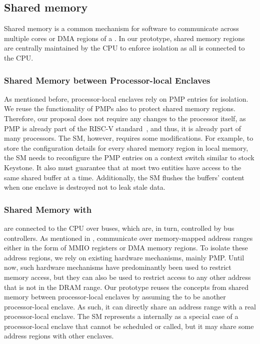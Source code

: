 \subsection{Shared memory}
\label{sec:approach:sharedMemory}
Shared memory is a common mechanism for software to communicate across multiple cores or DMA regions of a \sphw. In our prototype, shared memory regions are centrally maintained by the CPU to enforce isolation as all \sphw is connected to the CPU.



\subsubsection{Shared Memory between Processor-local Enclaves}
As mentioned before, processor-local enclaves rely on PMP entries for isolation. We reuse the functionality of PMPs also to protect shared memory regions. Therefore, our proposal does not require any changes to the processor itself, as PMP is already part of the RISC-V standard~\cite{riscv2019privspec}, and thus, it is already part of many processors. The SM, however, requires some modifications. For example, to store the configuration details for every shared memory region in local memory, the SM needs to reconfigure the PMP entries on a context switch similar to stock Keystone. It also must guarantee that at most two entities have access to the same shared buffer at a time. Additionally, the SM flushes the buffers' content when one enclave is destroyed not to leak stale data. 


\subsubsection{Shared Memory with \sphw}
\label{sec:approach:sharedMemory:peripheral}

\Sphw are connected to the CPU over buses, which are, in turn, controlled by bus controllers. As mentioned in , \sphw communicate over memory-mapped address ranges either in the form of MMIO registers or DMA memory regions. To isolate these address regions, we rely on existing hardware mechanisms, mainly PMP. Until now, such hardware mechanisms have predominantly been used to restrict memory access, but they can also be used to restrict access to any other address that is not in the DRAM range. Our prototype reuses the concepts from shared memory between processor-local enclaves by assuming the \sphw to be another processor-local enclave. As such, it can directly share an address range with a real processor-local enclave. The SM represents a \sphw internally as a special case of a processor-local enclave that cannot be scheduled or called, but it may share some address regions with other enclaves. 


